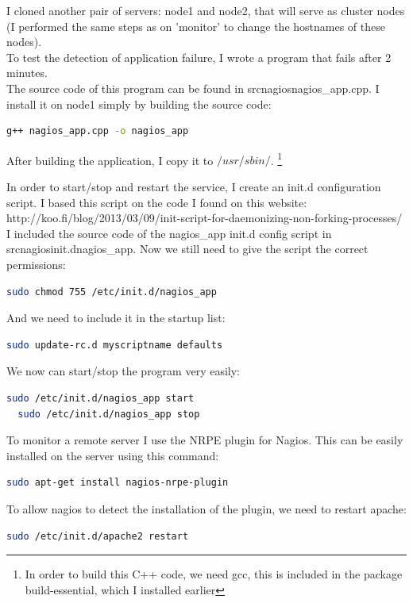 \documentclass[12pt]{report}
\begin{document}
I cloned another pair of servers: node1 and node2, that will serve as
cluster nodes (I performed the same steps as on 'monitor' to change
the hostnames of these nodes).\\

To test the detection of application failure, I wrote a program that
fails after 2 minutes. \\

The source code of this program can be found in src\/nagios\/nagios\_app.cpp.
I install it on node1 simply by building the source code:
\begin{lstlisting}[language=bash]
  g++ nagios_app.cpp -o nagios_app 
\end{lstlisting} 
After building the application, I copy it to $/usr/sbin/$.
\footnote{In order to build this C++ code, we need gcc, this is included
in the package build-essential, which I installed earlier}

In order to start/stop and restart the service, I create an init.d
configuration script.
I based this script on the code I found on this website: 
http://koo.fi/blog/2013/03/09/init-script-for-daemonizing-non-forking-processes/
I included the source code of the nagios\_app init.d config script in src\/nagios\/init.d\/nagios\_app.
Now we still need to give the script the correct permissions:
\begin{lstlisting}[language=bash]
  sudo chmod 755 /etc/init.d/nagios_app
\end{lstlisting} 
And we need to include it in the startup list:
\begin{lstlisting}[language=bash]
  sudo update-rc.d myscriptname defaults
\end{lstlisting}

We now can start/stop the program very easily:
\begin{lstlisting}[language=bash]
  sudo /etc/init.d/nagios_app start
  sudo /etc/init.d/nagios_app stop
\end{lstlisting}

To monitor a remote server I use the NRPE plugin for Nagios. 
This can be easily installed on the server using this command:
\begin{lstlisting}[language=bash]
  sudo apt-get install nagios-nrpe-plugin
\end{lstlisting} 

To allow nagios to detect the installation of the plugin, we need to
restart apache:
\begin{lstlisting}[language=bash]
  sudo /etc/init.d/apache2 restart
\end{lstlisting} 
\end{document}
